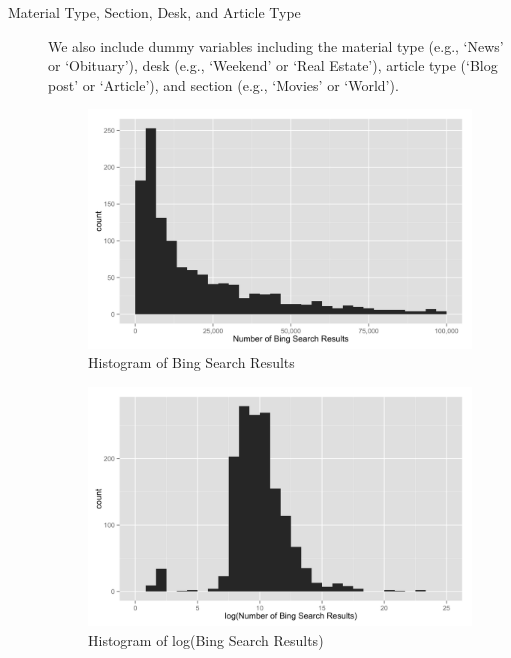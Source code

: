 \documentclass[fleqn,12pt]{SelfArx} %
\begin{document}
\begin{description}
	\item[Material Type, Section, Desk, and Article Type] We also include dummy variables including the material type (e.g., `News' or `Obituary'), desk (e.g., `Weekend' or `Real Estate'), article type (`Blog post' or `Article'), and section (e.g., `Movies' or `World').

\begin{figure}[ht]\centering
\includegraphics[width=\linewidth]{author_popularity_histogram.png}
\caption{Histogram of Bing Search Results}
\label{fig:ap_hist}
\end{figure}

\begin{figure}[ht]\centering
\includegraphics[width=\linewidth]{author_popularity_log_histogram.png}
\caption{Histogram of log(Bing Search Results)}
\label{fig:apl_hist}
\end{figure}
	

\end{description}
\end{document}
